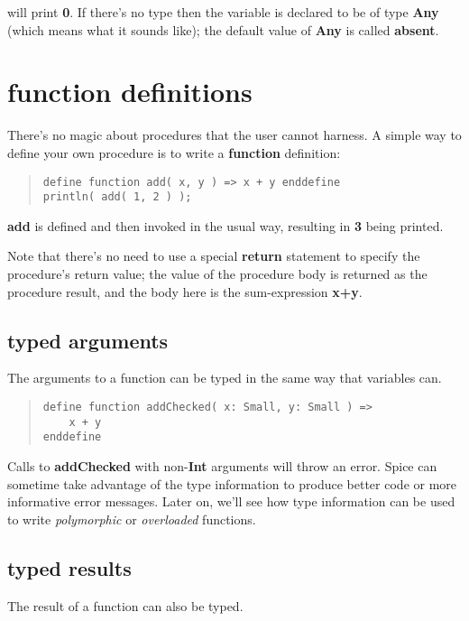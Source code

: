 \documentclass{report}
\begin{document}
will print {\bf 0}. If there's no type then the variable is declared to be of type
{\bf Any} (which means what it sounds like); the default value of {\bf Any} is called
{\bf absent}.\chapter{function definitions}


There's no magic about procedures that the user cannot harness. A simple
way to define your own procedure is to write a {\bf function} definition:

\begin{quote}
\begin{verbatim}
define function add( x, y ) => x + y enddefine
println( add( 1, 2 ) );
\end{verbatim}
\end{quote}


{\bf add} is defined and then  invoked in the usual way, resulting in {\bf 3} being
printed.

Note that there's no need to use a special {\bf return} statement to specify the
procedure's return value; the value of the procedure body is returned as the
procedure result, and the body here is the sum-expression {\bf x+y}.

\section{typed arguments}


The arguments to a function can be typed in the same way that variables can.

\begin{quote}
\begin{verbatim}
define function addChecked( x: Small, y: Small ) =>
    x + y
enddefine
\end{verbatim}
\end{quote}


Calls to {\bf addChecked} with non-{\bf Int} arguments will throw an error. Spice
can sometime take advantage of the type information to produce better code
or more informative error messages. Later on, we'll see how type information
can be used to write {\em polymorphic} or {\em overloaded} functions.

\section{typed results}


The result of a function can also be typed.
\end{document}
